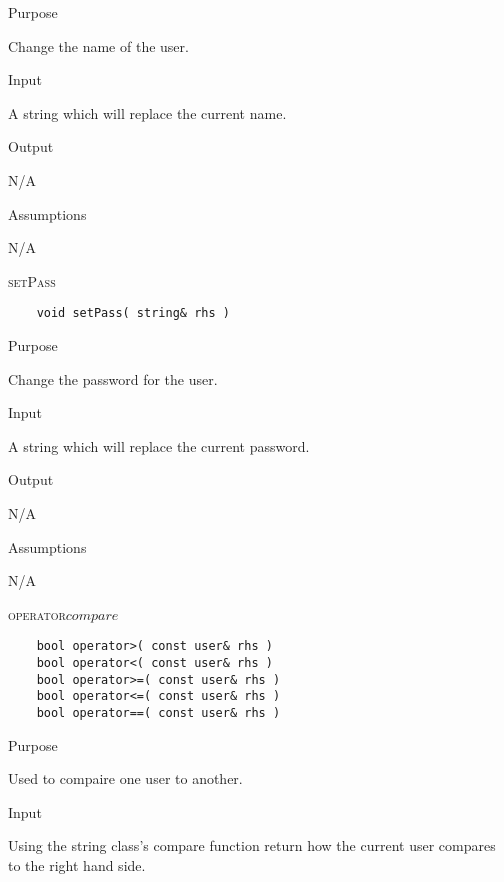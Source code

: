 \documentclass[pdftex, 12pt]{article}
\begin{document}
\begin{description}
\begin{description}
			\item{Purpose}

				Change the name of the user.

			\item{Input}

				A string which will replace the current name.

			\item{Output}

				N/A

			\item{Assumptions}

				N/A

		\end{description}
	\item{\textsc{setPass}}
\begin{lstlisting}
	void setPass( string& rhs )
\end{lstlisting}
		\begin{description}

			\item{Purpose}

				Change the password for the user.

			\item{Input}

				A string which will replace the current password.

			\item{Output}

				N/A

			\item{Assumptions}

				N/A

		\end{description}

	\item{\textsc{operator\(compare\)}}
\begin{lstlisting}
	bool operator>( const user& rhs )
	bool operator<( const user& rhs )
	bool operator>=( const user& rhs )
	bool operator<=( const user& rhs )
	bool operator==( const user& rhs )
\end{lstlisting}
		\begin{description}

			\item{Purpose}
				
				Used to compaire one user to another.

			\item{Input}

				Using the string class's compare function return how the current user compares to the right hand side.


\end{description}
\end{description}
\end{document}
